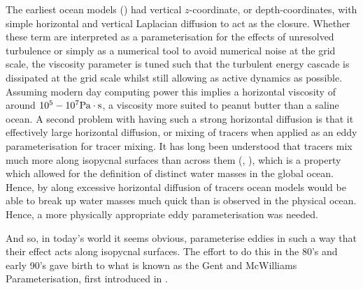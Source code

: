 \documentclass[10pt,a4paper]{article}
\begin{document}
 The earliest ocean models (\cite{bryan1969numerical}) had vertical $z$-coordinate, or depth-coordinates, with simple horizontal and vertical Laplacian diffusion to act as 
 the closure. Whether these term are interpreted as a parameterisation for the effects
 of unresolved turbulence or simply as a numerical tool to avoid numerical noise at 
 the grid scale, the viscosity parameter is tuned such that the turbulent energy cascade is 
 dissipated at the grid scale whilst still allowing as active dynamics as possible. 
 Assuming modern day computing power this implies a horizontal viscosity of around 
 $10^{5} - 10^{7} \rm Pa \cdot s$, a viscosity more suited to peanut butter than 
 a saline ocean. A second problem with having such a strong horizontal diffusion is
 that it effectively large horizontal diffusion, or mixing of tracers when applied as
 an eddy parameterisation for tracer mixing. It has long been understood that tracers 
 mix much more along isopycnal surfaces than across them (\cite{iselin1939influence}, \cite{montgomery1940present}), which is a property which allowed for the definition of
 distinct water masses in the global ocean. Hence, by along excessive horizontal diffusion
 of tracers ocean models would be able to break up water masses much quick than
 is observed in the physical ocean. Hence, a more physically appropriate eddy parameterisation 
 was needed.
 
 And so, in today's world it seems obvious, parameterise eddies in such a way that their effect
 acts along isopycnal surfaces. The effort to do this in the 80's and early 90's gave birth
 to what is known as the Gent and McWilliams Parameterisation, first introduced in \cite{gent1990}.
\end{document}
